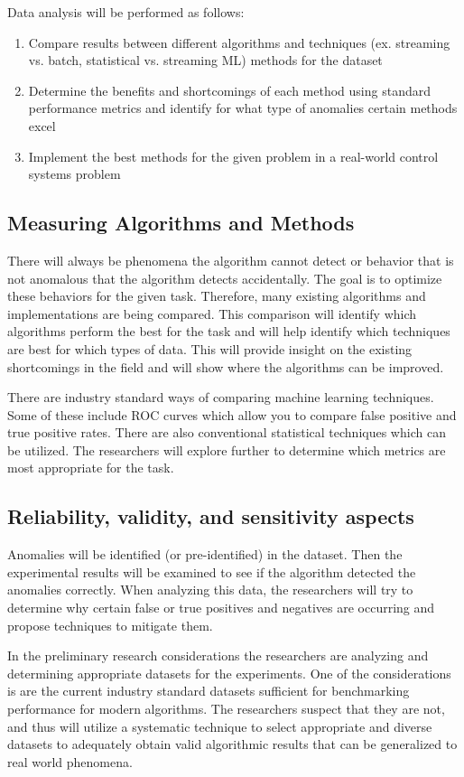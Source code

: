 Data  analysis will be performed as follows:
\begin{enumerate}
    \item Compare results between different algorithms and techniques (ex. streaming vs. batch, statistical vs. streaming ML) methods for the dataset 
    \item Determine the benefits and shortcomings of each method using standard performance metrics and identify for what type of anomalies certain methods excel
    \item Implement the best methods for the given problem in a real-world control systems problem
\end{enumerate}

\subsection{Measuring Algorithms and Methods}

There will always be phenomena the algorithm cannot detect or behavior that is not anomalous that the algorithm detects accidentally. The goal is to optimize these behaviors for the given task. Therefore, many existing algorithms and implementations are being compared. This comparison will identify which algorithms perform the best for the task and will help identify which techniques are best for which types of data. This will provide insight on the existing shortcomings in the field and will show where the algorithms can be improved.

There are industry standard ways of comparing machine learning techniques. Some of these include ROC curves which allow you to compare false positive and true positive rates. There are also conventional statistical techniques which can be utilized. The researchers will explore further to determine which metrics are most appropriate for the task.

\subsection{Reliability, validity, and sensitivity aspects}
Anomalies will be identified (or pre-identified) in the dataset. Then the experimental results will be examined to see if the algorithm detected the anomalies correctly. When analyzing this data, the researchers will try to determine why certain false or true positives and negatives are occurring and propose techniques to mitigate them.

In the preliminary research considerations the researchers are analyzing and determining appropriate datasets for the experiments. One of the considerations is are the current industry standard datasets sufficient for benchmarking performance for modern algorithms. The researchers suspect that they are not, and thus will utilize a systematic technique to select appropriate and diverse datasets to adequately obtain valid algorithmic results that can be generalized to real world phenomena. 


